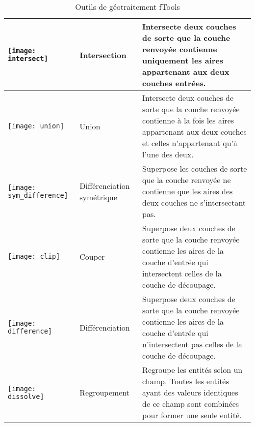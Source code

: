 \begin{table}[ht]
\begin{tabular}{|m{1cm}|m{3cm}|m{9cm}|}
 \hline \texttt{[image: intersect]} & Intersection & Intersecte deux couches de sorte que la couche renvoyée contienne uniquement les aires appartenant aux deux couches entrées. \\
 \hline \texttt{[image: union]} & Union & Intersecte deux couches de sorte que la couche renvoyée contienne à la fois les aires appartenant aux deux couches et celles n'appartenant qu'à l'une des deux. \\
 \hline \texttt{[image: sym\_difference]} & Différenciation symétrique & Superpose les couches de sorte que la couche renvoyée ne contienne que les aires des deux couches ne s'intersectant pas. \\
 \hline \texttt{[image: clip]} & Couper & Superpose deux couches de sorte que la couche renvoyée contienne les aires de la couche d'entrée qui intersectent celles de la couche de découpage. \\
 \hline \texttt{[image: difference]} & Différenciation & Superpose deux couches de sorte que la couche renvoyée contienne les aires de la couche d'entrée qui n'intersectent pas celles de la couche de découpage. \\
 \hline \texttt{[image: dissolve]} & Regroupement & Regroupe les entités selon un champ. Toutes les entités ayant des valeurs identiques de ce champ sont combinées pour former une seule entité. \\
 \hline
\end{tabular}
\caption{Outils de géotraitement fTools}\label{tab:ftool_geoprocessing}
\end{table}

